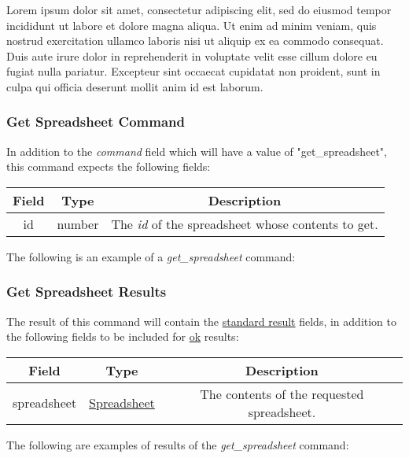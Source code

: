 Lorem ipsum dolor sit amet, consectetur adipiscing elit, sed do eiusmod tempor incididunt ut labore et dolore magna aliqua. Ut enim ad minim veniam, quis nostrud exercitation ullamco laboris nisi ut aliquip ex ea commodo consequat. Duis aute irure dolor in reprehenderit in voluptate velit esse cillum dolore eu fugiat nulla pariatur. Excepteur sint occaecat cupidatat non proident, sunt in culpa qui officia deserunt mollit anim id est laborum.

\subsubsection{Get Spreadsheet Command}
In addition to the \emph{command} field which will have a value of "get\_spreadsheet", this command expects the following fields:
\begin{table}[H]
    \begin{center}
        \begin{tabular}{|c|c|c|}\hline
            Field & Type & Description \\\hline
            id & number & The \emph{id} of the spreadsheet whose contents to get. \\\hline
        \end{tabular}
    \end{center}
\end{table}

The following is an example of a \emph{get\_spreadsheet} command:


\subsubsection{Get Spreadsheet Results}
The result of this command will contain the \hyperref[sec:message:result]{standard result} fields, in addition to the following fields to be included for \underline{ok} results:
\begin{table}[H]
    \begin{center}
        \begin{tabular}{|c|c|c|}\hline
            Field & Type & Description \\\hline
            spreadsheet & \hyperref[sec:message:spreadsheet]{Spreadsheet} & The contents of the requested spreadsheet. \\\hline
        \end{tabular}
    \end{center}
\end{table}

The following are examples of results of the \emph{get\_spreadsheet} command:



